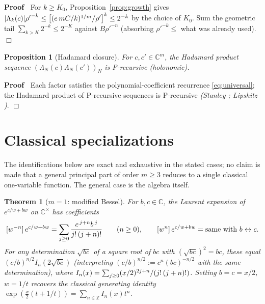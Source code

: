 \documentclass{article}
\newcommand{\assign}{:=}
\newcommand{\tmem}[1]{{\em #1\/}}
\newenvironment{proof}{\noindent\textbf{Proof\ }}{\hspace*{\fill}$\Box$\medskip}
\newtheorem{proposition}{Proposition}
{\theorembodyfont{\rmfamily}\newtheorem{remark}{Remark}}
\newtheorem{theorem}{Theorem}
\newcommand{\C}{\mathbb{C}}
\newcommand{\Z}{\mathbb{Z}}
\begin{document}
\begin{proof}
  For $k \ge K_0$, Proposition~\ref{prop:growth} gives $| \Lambda_k (c) |
  {\rho'}^{- k} \le \left[ (e \hspace{0.17em} mC / k)^{1 / m} / \rho'
  \right]^k \le 2^{- k}$ by the choice of $K_0$. Sum the geometric tail
  $\sum_{k > K} 2^{- k} \le 2^{- K}$ against ${B \rho'}^{- n}$ (absorbing
  ${\rho'}^{- k} \le$ what was already used).
\end{proof}

\begin{proposition}
  [Hadamard closure]\label{prop:hadamard} For $c, c' \in \C^m$, the Hadamard
  product sequence $(\Lambda_N (c) \Lambda_N (c'))_N$ is P-recursive
  (holonomic).
\end{proposition}

\begin{proof}
  Each factor satisfies the polynomial-coefficient recurrence
  \eqref{eq:universal}; the Hadamard product of P-recursive sequences is
  P-recursive {\tmem{(Stanley {\cite{StanleyDF}}; Lipshitz
  {\cite{Lipshitz}})}}.
\end{proof}

\section{Classical specializations}\label{sec:classical}

The identifications below are exact and exhaustive in the stated cases; no
claim is made that a general principal part of order $m \ge 3$ reduces to a
single classical one-variable function. The general case is the algebra
itself.

\begin{theorem}
  [$m = 1$: modified Bessel]\label{thm:bessel} For $b, c \in \C$, the Laurent
  expansion of $e^{c / w + bw}$ on $\C^{\times}$ has coefficients
  \[ [w^{- n}]  \hspace{0.17em} e^{c / w + bw} = \sum_{j \ge 0}
     \frac{c^{\hspace{0.17em} j + n} b^{\hspace{0.17em} j}}{j! \hspace{0.17em}
     (j + n) !}  \qquad (n \ge 0), \qquad [w^n]  \hspace{0.17em} e^{c / w +
     bw} = \text{same with } b \leftrightarrow c. \]
  For any determination $\sqrt{bc}$ of a square root of $bc$ with
  $(\sqrt{bc})^2 = bc$, these equal $(c / b)^{n / 2} I_n  (2 \sqrt{bc})$
  (interpreting $(c / b)^{n / 2} \assign c^n  (bc)^{- n / 2}$ with the same
  determination), where $I_n (x) = \sum_{j \ge 0} (x / 2)^{2 j + n} / (j!
  \hspace{0.17em} (j + n) !)$. Setting $b = c = x / 2$, $w = 1 / t$ recovers
  the classical generating identity $\exp \left( \tfrac{x}{2} (t + 1 / t)
  \right) = \sum_{n \in \Z} I_n (x) t^n$.
\end{theorem}
\end{document}
